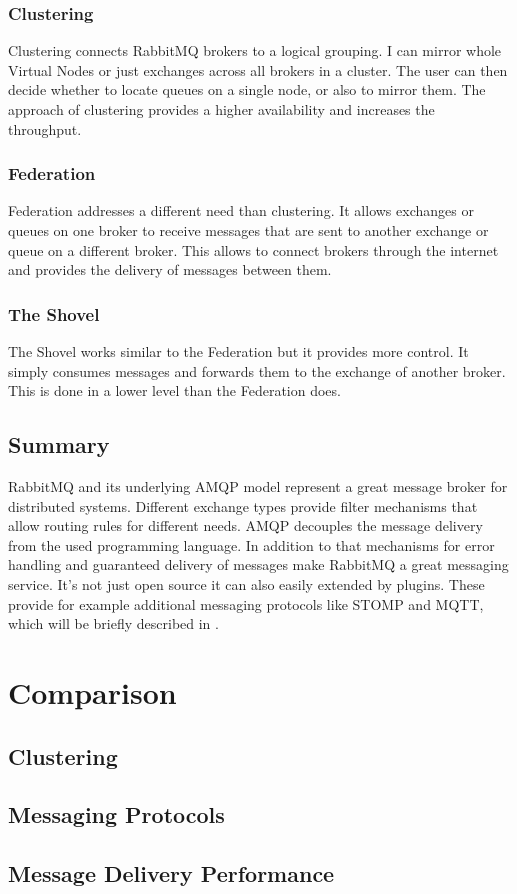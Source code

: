 \subsubsection{Clustering}
Clustering connects RabbitMQ brokers to a logical grouping. I can mirror whole Virtual Nodes or just exchanges across all brokers in a cluster. The user can then decide whether to locate queues on a single node, or also to mirror them. The approach of clustering provides a higher availability and increases the throughput.

\subsubsection{Federation}
Federation addresses a different need than clustering. It allows exchanges or queues on one broker to receive messages that are sent to another exchange or queue on a different broker. This allows to connect brokers through the internet and provides the delivery of messages between them.

\subsubsection{The Shovel}
The Shovel works similar to the Federation but it provides more control. It simply consumes messages and forwards them to the exchange of another broker. This is done in a lower level than the Federation does.

\subsection{Summary}
RabbitMQ and its underlying AMQP model represent a great message broker for distributed systems. Different exchange types provide filter mechanisms that allow routing rules for different needs. AMQP decouples the message delivery from the used programming language. In addition to that mechanisms for error handling and guaranteed delivery of messages make RabbitMQ a great messaging service. It's not just open source it can also easily extended by plugins. These provide for example additional messaging protocols like STOMP and MQTT, which will be briefly described in .

\section{Comparison}

\subsection{Clustering}

\subsection{Messaging Protocols}
\label{sec:protocols}

\subsection{Message Delivery Performance}

